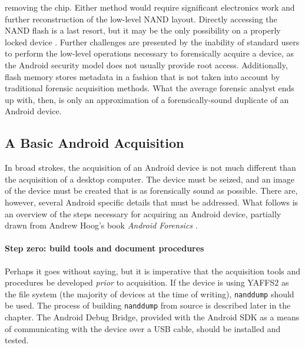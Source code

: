 removing the chip.  Either method would require significant electronics work and further reconstruction of the low-level NAND
layout. Directly accessing the NAND flash is a last resort, but it may be the only possibility on a properly locked device
\cite{chipoff}.  Further challenges are presented by the inability of standard users to perform the low-level operations necessary
to forensically acquire a device, as the Android security model does not usually provide root access.  Additionally, flash memory
stores metadata in a fashion that is not taken into account by traditional forensic acquisition methods.  What the average forensic
analyst ends up with, then, is only an approximation of a forensically-sound duplicate of an Android device. 

\subsection{A Basic Android Acquisition}

In broad strokes, the acquisition of an Android device is not much different than the acquisition of a desktop computer. 
The device must be seized, and an image of the device must be created that is as forensically sound as possible.  There are,
however, several Android specific details that must be addressed.  What follows is an overview of the steps necessary for acquiring
an Android device, partially drawn from Andrew Hoog's book \emph{Android Forensics} \cite{hoog}.

\paragraph{Step zero: build tools and document procedures}
Perhaps it goes without saying, but it is imperative that the acquisition tools and procedures be developed \emph{prior} to
acquisition.  If the device is using YAFFS2 as the file system (the majority of devices at the time of writing), \texttt{nanddump}
should  be used.  The process of building \texttt{nanddump} from source is described later in the chapter.  The Android Debug
Bridge, provided with the Android SDK as a means of communicating with the device over a USB cable, should be installed and tested. 

